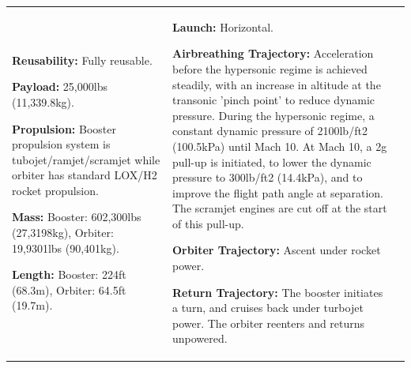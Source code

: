 {\begin{landscape}
\begin{xltabular}{\linewidth}{|X|X|X|}
	\textbf{Reusability:} Fully reusable.
	
	\textbf{Payload:} 25,000lbs (11,339.8kg).
	
	\textbf{Propulsion:} Booster propulsion system is tubojet/ramjet/scramjet while orbiter has standard LOX/H2 rocket propulsion. 
	
	\textbf{Mass:} Booster: 602,300lbs (27,3198kg), Orbiter: 19,9301lbs (90,401kg).
	
	\textbf{Length:} Booster: 224ft (68.3m), Orbiter: 64.5ft (19.7m).
	&\small
	
	\textbf{Launch:} Horizontal.
	
	\textbf{Airbreathing Trajectory:} Acceleration before the hypersonic regime is achieved steadily, with an increase in altitude at the transonic 'pinch point' to reduce dynamic pressure. 
	During the hypersonic regime, a constant dynamic pressure of 2100lb/ft2 (100.5kPa) until Mach 10.
	At Mach 10, a 2g pull-up is initiated, to lower the dynamic pressure to 300lb/ft2 (14.4kPa), and to improve the flight path angle at separation. The scramjet engines are cut off at the start of this pull-up.  
	
	\textbf{Orbiter Trajectory:} Ascent under rocket power. 
	
	\textbf{Return Trajectory:} The booster initiates a turn, and cruises back under turbojet power. 
	The orbiter reenters and returns unpowered. 
	

\end{xltabular}
\end{landscape}}

